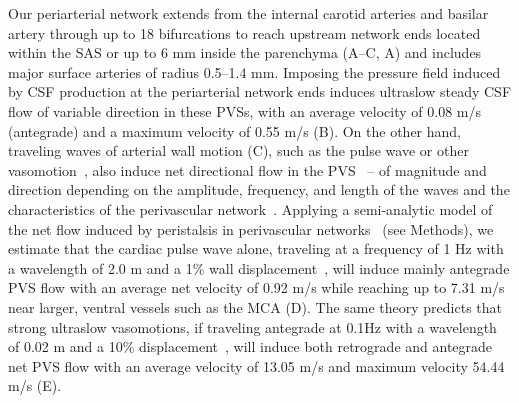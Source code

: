 \documentclass[fleqn,10pt]{wlscirep}
\begin{document}
Our periarterial network extends from the internal carotid arteries
and basilar artery through up to 18 bifurcations to reach upstream
network ends located within the SAS or up to 6 mm inside the
parenchyma (A--C, A) and includes
major surface arteries of radius 0.5--1.4 mm. Imposing the pressure
field induced by CSF production at the periarterial network ends
induces ultraslow steady CSF flow of variable direction in these PVSs,
with an average velocity of 0.08 \textmu m/s (antegrade) and a maximum
velocity of 0.55 \textmu m/s (B). On the other hand,
traveling waves of arterial wall motion (C), such as the
pulse wave or other vasomotion~\cite{vanveluw2020vasomotion,
  munting2023spontaneous, bojarskaite2023sleep, broggini2024long},
also induce net directional flow in the
PVS~\cite{kedarasetti2020arterial, kedarasetti2020functional,
  coenen2021lubrication, gjerde2023directional, nozaleda2024arterial}
-- of magnitude and direction depending on the amplitude, frequency,
and length of the waves and the characteristics of the perivascular
network~\cite{gjerde2023directional}. Applying a
semi-analytic model of the net flow induced by peristalsis in
perivascular networks~\cite{gjerde2023directional} (see Methods), we
estimate that the cardiac pulse wave alone, traveling at a frequency
of 1 Hz with a wavelength of 2.0 m and a 1\% wall
displacement~\cite{jung2021novel}, will induce mainly antegrade PVS
flow with an average net velocity of 0.92 \textmu m/s while reaching up
to 7.31 \textmu m/s near larger, ventral vessels such as the MCA
(D). The same theory predicts that strong ultraslow
vasomotions, if traveling antegrade at 0.1Hz with a wavelength of 0.02
m and a 10\% displacement~\cite{broggini2024long}, will induce both
retrograde and antegrade net PVS flow with an average velocity of
13.05 \textmu m/s and maximum velocity 54.44 \textmu m/s
(E).
\end{document}
